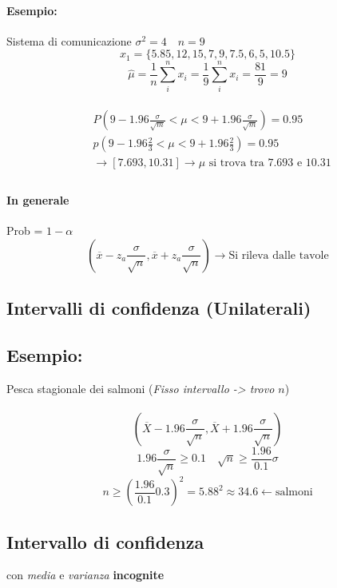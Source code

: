 \documentclass[]{article}
\begin{document}
    \paragraph{Esempio:} Sistema di comunicazione
    $\sigma^2 = 4 \quad n = 9$
    \[ x_1 = \{ 5.85, 12, 15, 7, 9, 7.5, 6, 5, 10.5 \} \]
    \[ \hat{\mu} = \frac{1}{n} \sum_{i}^{n} x_i = \frac{1}{9} \sum_{i}^{n} x_i = \frac{81}{9} = 9 \] \\
    \begin{equation*}
        \begin{aligned}
            & P\left(9-1.96 \frac{\sigma}{\sqrt{m}}<\mu<9+1.96 \frac{\sigma}{\sqrt{m}}\right)=0.95 \\
            & p\left(9-1.96 \frac{2}{3}<\mu<9+1.96 \frac{2}{3}\right)=0.95 \\
            & \longrightarrow[7.693,10.31] \rightarrow \mu \text { si trova tra 7.693 e 10.31} \\
        \end{aligned}
    \end{equation*}
    \paragraph{In generale} Prob = $1-\alpha$
    \[ (\overline{x} - z_a \frac{\sigma}{\sqrt{n}}, \overline{x} + z_a \frac{\sigma}{\sqrt{n}} ) \rightarrow \text{Si rileva dalle tavole} \]

    \subsection{Intervalli di confidenza (Unilaterali)}
    \subsection{Esempio:} Pesca stagionale dei salmoni (\textit{Fisso intervallo -> trovo $n$}) \\
     \\
    \[ (\overline{X} - 1.96 \frac{\sigma}{\sqrt{n}}, \overline{X} + 1.96 \frac{\sigma}{\sqrt{n}}) \]
    \[ 1.96 \frac{\sigma}{\sqrt{n}} \geq 0.1 \quad \sqrt{n} \geq \frac{1.96}{0.1} \sigma \]
    \[ n \geq (\frac{1.96}{0.1} 0.3)^2 = 5.88^2 \approx 34.6 \leftarrow \text{salmoni} \]
    \subsection{Intervallo di confidenza} con \textit{media} e \textit{varianza} \textbf{incognite}
\end{document}

